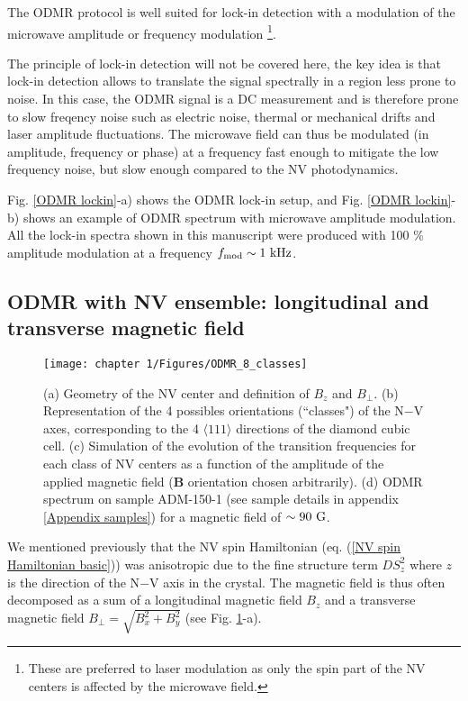 \documentclass[a4paper, 11pt]{report}
\begin{document}
The ODMR protocol is well suited for lock-in detection with a modulation of the microwave amplitude or frequency modulation \footnote{These are preferred to laser modulation as only the spin part of the NV centers is affected by the microwave field.}.

The principle of lock-in detection will not be covered here, the key idea is that lock-in detection allows to translate the signal spectrally in a region less prone to noise. In this case, the ODMR signal is a DC measurement and is therefore prone to slow freqency noise such as electric noise, thermal or mechanical drifts and laser amplitude fluctuations. The microwave field can thus be modulated (in amplitude, frequency or phase) at a frequency fast enough to mitigate the low frequency noise, but slow enough compared to the NV photodynamics. 

Fig. \ref{ODMR lockin}-a) shows the ODMR lock-in setup, and Fig. \ref{ODMR lockin}-b) shows an example of ODMR spectrum with microwave amplitude modulation. All the lock-in spectra shown in this manuscript were produced with 100 \% amplitude modulation at a frequency $f_{\rm mod} \sim 1\ \rm kHz$.

\subsection{ODMR with NV ensemble: longitudinal and transverse magnetic field}
\label{sec champs transverse}
\begin{figure}[h!]
\centering
\texttt{[image: chapter 1/Figures/ODMR\_8\_classes]}
\caption{(a) Geometry of the NV center and definition of $B_z$ and $B_\perp$. (b) Representation of the 4 possibles orientations (``classes") of the N$-$V axes, corresponding to the 4 $\langle 111 \rangle$ directions of the diamond cubic cell. (c) Simulation of the evolution of the transition frequencies for each class of NV centers as a function of the amplitude of the applied magnetic field ($\textbf{B}$ orientation chosen arbitrarily). (d) ODMR spectrum on sample ADM-150-1 (see sample details in appendix \ref{Appendix samples}) for a magnetic field of $\sim 90\ \rm G$.}
\label{ODMR 8 classes}
\end{figure}

We mentioned previously that the NV spin Hamiltonian (eq. (\ref{NV spin Hamiltonian basic})) was anisotropic due to the fine structure term $D S_z^2$ where $z$ is the direction of the N$-$V axis in the crystal. The magnetic field is thus often decomposed as a sum of a longitudinal magnetic field $B_z$ and a transverse magnetic field $B_\perp=\sqrt{B_x^2+B_y^2}$ (see Fig. \ref{ODMR 8 classes}-a). 
\end{document}
